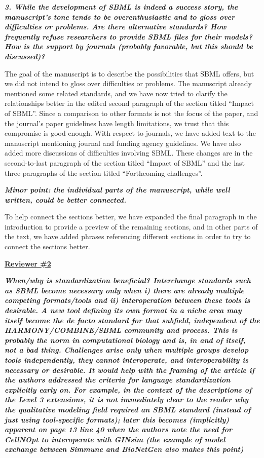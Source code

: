 \documentclass[11pt]{mhletter}
\begin{document}
\textbf{\textit{3. While the development of SBML is indeed a success story, the manuscript's tone tends to be overenthusiastic and to gloss over difficulties or problems. Are there alternative standards? How frequently refuse researchers to provide SBML files for their models? How is the support by journals (probably favorable, but this should be discussed)?}}

The goal of the manuscript is to describe the possibilities that SBML offers, but we did not intend to gloss over difficulties or problems.  The manuscript already mentioned some related standards, and we have now tried to clarify the relationships better in the edited second paragraph of the section titled ``Impact of SBML''.  Since a comparison to other formats is not the focus of the paper, and the journal's paper guidelines have length limitations, we trust that this compromise is good enough.  With respect to journals, we have added text to the manuscript mentioning journal and funding agency guidelines.  We have also added more discussions of difficulties involving SBML.  These changes are in the second-to-last paragraph of the section titled ``Impact of SBML'' and the last three paragraphs of the section titled ``Forthcoming challenges''.


\textbf{\textit{Minor point: the individual parts of the manuscript, while well written, could be better connected.}}

To help connect the sections better, we have expanded the final paragraph in the introduction to provide a preview of the remaining sections, and in other parts of the text, we have added phrases referencing different sections in order to try to connect the sections better.


\clearpage
\textbf{\underline{Reviewer \#2}}

\textbf{\textit{When/why is standardization beneficial? Interchange standards such as SBML become necessary only when i) there are already multiple competing formats/tools and ii) interoperation between these tools is desirable. A new tool defining its own format in a niche area may itself become the de facto standard for that subfield, independent of the HARMONY/COMBINE/SBML community and process. This is probably the norm in computational biology and is, in and of itself, not a bad thing. Challenges arise only when multiple groups develop tools independently, they cannot interoperate, and interoperability is necessary or desirable. It would help with the framing of the article if the authors addressed the criteria for language standardization explicitly early on. For example, in the context of the descriptions of the Level 3 extensions, it is not immediately clear to the reader why the qualitative modeling field required an SBML standard (instead of just using tool-specific formats); later this becomes (implicitly) apparent on page 13 line 40 when the authors note the need for CellNOpt to interoperate with GINsim (the example of model exchange between Simmune and BioNetGen also makes this point)}}
\end{document}
